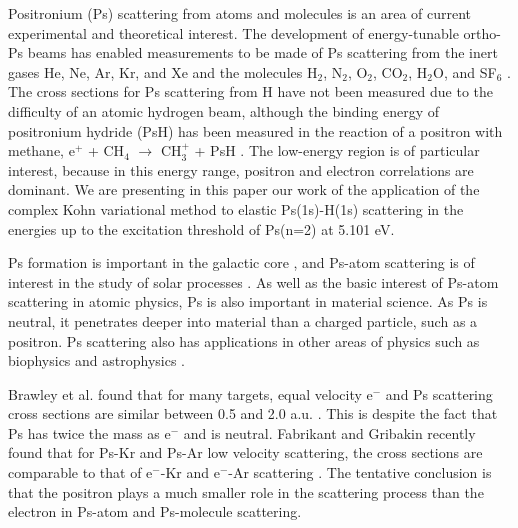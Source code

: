 \documentclass[preprint,showpacs,showkeys,preprintnumbers,amsmath,amssymb,longbibliography,pra,aps]{revtex4-1}
\begin{document}
Positronium (Ps) scattering from atoms and molecules is an area of current 
experimental and theoretical interest. The development of energy-tunable
ortho-Ps beams
\cite{Brown1985,Laricchia1987,Zafar1996,Garner1996,Laricchia2008} 
has enabled measurements to be made of Ps scattering from the inert gases He, 
Ne, Ar, Kr, and Xe
\cite{Garner1996,Garner2000,Armitage2002,Laricchia2004,Armitage2006,Laricchia2008,Engbrecht2008,Brawley2010a}
and the molecules H$_2$, N$_2$, O$_2$, CO$_2$, H$_2$O, and SF$_6$
\cite{Garner1996,Garner1998,Garner2000,Laricchia2004,Armitage2006,Beale2006,Brawley2010a}.
The cross sections for Ps scattering from H have not been measured due to the
difficulty of an atomic hydrogen beam, although the binding energy of positronium
hydride (PsH) has been measured in the reaction of a positron with methane,
e$^+$ + CH$_4$ $\to$ CH$_3^+$ + PsH \cite{Schrader1992}. The low-energy region
is of particular interest, because in this energy range, positron and electron 
correlations are dominant. We are presenting
\cite{Conferences1,Conferences2,Conferences3} 
in this paper our work of the application of the complex Kohn variational 
method to elastic Ps(1s)-H(1s) scattering in the energies up to the 
excitation threshold of Ps(n=2) at 5.101 eV.

Ps formation is important in the galactic core \cite{Kinzer1996}, and Ps-atom 
scattering is of interest in the study of solar processes \cite{Crannell1976}
. As well as the basic interest of Ps-atom scattering in atomic physics, Ps 
is also important in material science. As Ps is neutral, it penetrates deeper 
into material than a charged particle, such as a positron. Ps scattering also 
has applications in other areas of physics such as biophysics and 
astrophysics \cite{Laricchia2012}.

Brawley et al. found that for many targets, equal velocity e$^-$ and Ps 
scattering cross sections are similar between 0.5 and 2.0 a.u.
\cite{Brawley2010a,Brawley2010}. This is despite the fact that Ps has twice
the mass as e$^-$ and is neutral. Fabrikant and Gribakin recently found that
for Ps-Kr and Ps-Ar low velocity scattering, the cross sections are comparable
to that of e$^-$-Kr and e$^-$-Ar scattering
\cite{Fabrikant2014,Fabrikant2014a}. The tentative conclusion is that the
positron plays a much smaller role in the scattering process than the electron
in Ps-atom and Ps-molecule scattering.
\end{document}
